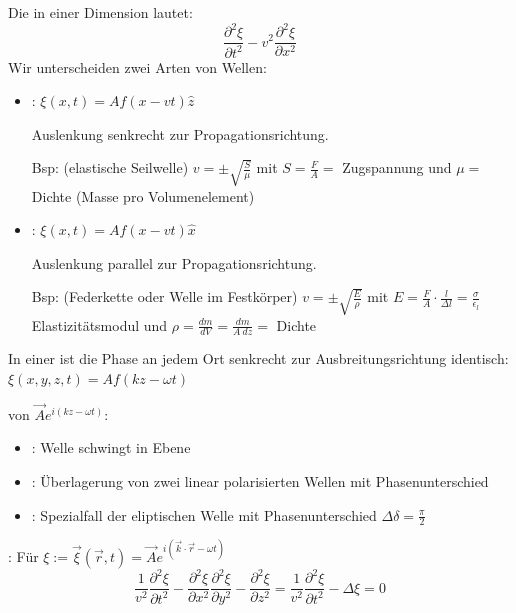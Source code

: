 Die  in einer Dimension lautet:
\[
  \frac{\partial^2 \xi}{\partial t^2} - v^2 \frac{\partial^2 \xi}{\partial x^2}  
\]
Wir unterscheiden zwei Arten von Wellen:
\begin{itemize}
    \item {}: $\xi (x,t) = A f(x-vt) \hat{z}$
    
            Auslenkung senkrecht zur Propagationsrichtung.
            
            Bsp: (elastische Seilwelle)
            $v = \pm \sqrt{\frac{S}{\mu}}$ mit $S=\frac{F}{A}=$ Zugspannung und $\mu=$ Dichte (Masse
            pro Volumenelement)

    \item {}: $\xi (x,t) = A f(x-vt) \hat{x}$
    
            Auslenkung parallel zur Propagationsrichtung.

            Bsp: (Federkette oder Welle im Festkörper)
            $v= \pm \sqrt{\frac{E}{\rho}}$ mit $E= \frac{F}{A} \cdot \frac{l}{\Delta l}
            = \frac{\sigma}{\epsilon_l}$
            Elastizitätsmodul und $\rho= \frac{dm}{dV} = \frac{dm}{A \ dz} =$ Dichte
\end{itemize}

\vspace{1\baselineskip}

In einer  ist die Phase an jedem Ort senkrecht zur Ausbreitungsrichtung
identisch: $\xi(x,y,z,t) = A f(kz-\omega t)$

\vspace{1\baselineskip}

 von $\vec{A} e^{i (kz-\omega t)}$:
\begin{itemize}
    \item {}: Welle schwingt in Ebene
    \item {}: Überlagerung von zwei linear polarisierten Wellen mit Phasenunterschied
    \item {}: Spezialfall der eliptischen Welle mit
            Phasenunterschied $\Delta \delta = \frac{\pi}{2}$
\end{itemize}

\vspace{1\baselineskip}

: Für $\xi := \vec{\xi}(\vec{r},t) = \vec{A} e^{i (\vec{k} \cdot \vec{r} - \omega t)}$
\[
    \frac{1}{v^2} \frac{\partial^2 \xi}{\partial t^2} - \frac{\partial^2 \xi}{\partial x^2}
    \frac{\partial^2 \xi}{\partial y^2} - \frac{\partial^2 \xi}{\partial z^2} 
    = \frac{1}{v^2} \frac{\partial^2 \xi}{\partial t^2} - \Delta \xi
    = 0
\]

